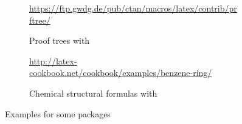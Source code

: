 \begin{figure}[p]
{\begin{subfigure}{\widefigurewidth}
		\end{subfigure}
		\colrules
		\begin{subfigure}[t]{\widefigurewidth}
			\caption{Proof trees with }
			\centering\tiny{\url{https://ftp.gwdg.de/pub/ctan/macros/latex/contrib/prftree/}}
			\label{fig:prftree-example}
		\end{subfigure}
		\hspace{\widefiguregap}
		\begin{subfigure}[t]{\widefigurewidth}
			\caption{Chemical structural formulas with }
			\centering\tiny{\url{http://latex-cookbook.net/cookbook/examples/benzene-ring/}}
			\label{fig:chemfig-example}
		\end{subfigure}
		\medskip
	}
	\caption{Examples for some packages}
	\label{fig:package-examples}
\end{figure}


